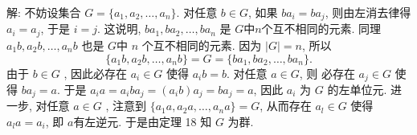 \documentclass[a4paper,12pt]{ctexart}
\begin{document}
    解: 
    不妨设集合 $ G = \{a_1, a_2, \dots , a_n\} $. 对任意 $ b \in G $, 如果 $ba_i = ba_j$, 
    则由左消去律得 $ a_i = a_j $, 于是 $ i = j $. 这说明, $ba_1, ba_2, \dots, ba_n $ 是 $G $中$ n $个互不相同的元素. 
    同理 $a_1b, a_2b, \dots , a_nb $ 也是 $ G $中 $ n $ 个互不相同的元素. 因为 $ | G| = n $, 所以
    \[ \{a_1b, a_2b, \dots , a_nb\} = G = \{ba_1, ba_2, \dots , ba_n\}. \]
    由于 $ b\in G $ , 因此必存在 $ a_i\in G $ 使得 $ a_ib = b$. 对任意 $ a\in G $, 则
    必存在 $ a_j \in G $ 使得 $ ba_j = a $. 于是 $ a_ia = a_iba_j = (a_ib)a_j = ba_j = a $, 
    因此 $ a_i $ 为 $ G $ 的左单位元. 进一步, 对任意 $ a\in  G $ , 注意到 $\{a_1a, a_2a, \dots , a_na\} = G $, 
    从而存在 $ a_l \in G $ 使得 $ a_la = a_i $, 即 $ a $有左逆元. 于是由定理 18 知 $ G $ 为群.
\end{document}
